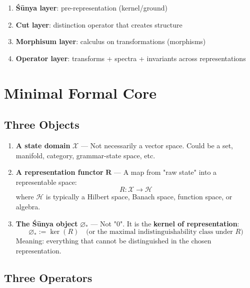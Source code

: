 \documentclass[12pt, oneside]{article}
\begin{document}
\begin{enumerate}
    \item \textbf{Śūnya layer}: pre-representation (kernel/ground)
    \item \textbf{Cut layer}: distinction operator that creates structure
    \item \textbf{Morphisum layer}: calculus on transformations (morphisms)
    \item \textbf{Operator layer}: transforms + spectra + invariants across representations
\end{enumerate}

\section{Minimal Formal Core}

\subsection{Three Objects}

\begin{enumerate}
    \item \textbf{A state domain} $\mathcal{X}$ — Not necessarily a vector space. Could be a set, manifold, category, grammar-state space, etc.
    
    \item \textbf{A representation functor} $\mathbf{R}$ — A map from "raw state" into a representable space:
    \begin{equation}
    R: \mathcal{X} \rightarrow \mathcal{H}
    \end{equation}
    where $\mathcal{H}$ is typically a Hilbert space, Banach space, function space, or algebra.
    
    \item \textbf{The Śūnya object} $\varnothing_*$ — Not "0". It is the \textbf{kernel of representation}:
    \begin{equation}
    \varnothing_* := \ker(R) \quad \text{(or the maximal indistinguishability class under }R\text{)}
    \end{equation}
    Meaning: everything that cannot be distinguished in the chosen representation.
\end{enumerate}

\subsection{Three Operators}
\end{document}
